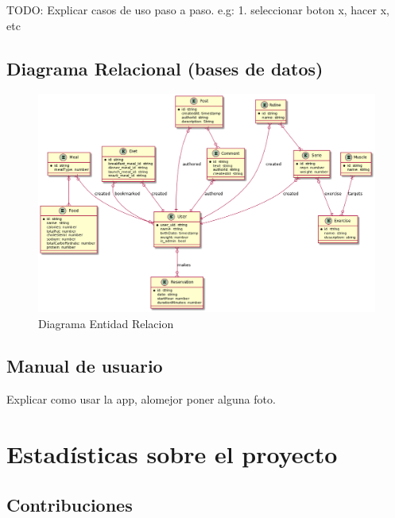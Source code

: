 \documentclass[12pt,a4paper]{article}
\begin{document}
TODO: Explicar casos de uso paso a paso. e.g: 1. seleccionar boton x, hacer x, etc

\newpage

\subsection{Diagrama Relacional (bases de datos)}

\begin{figure}[h]
 	\centering
	\includegraphics[width=\textwidth]{diagramaer}
	\caption{Diagrama Entidad Relacion}
\end{figure}

\clearpage

\subsection{Manual de usuario}
Explicar como usar la app, alomejor poner alguna foto.

\newpage

\section{Estadísticas sobre el proyecto}

\subsection{Contribuciones}
\end{document}
